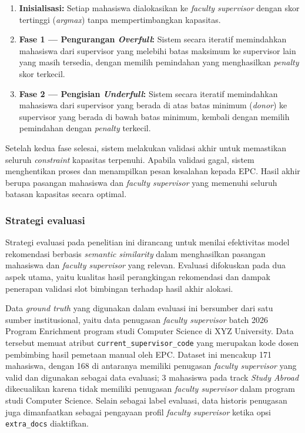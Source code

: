 \begin{enumerate}
    \item \textbf{Inisialisasi:} Setiap mahasiswa dialokasikan ke \textit{faculty supervisor} dengan skor tertinggi (\textit{argmax}) tanpa mempertimbangkan kapasitas.
    \item \textbf{Fase 1 — Pengurangan \textit{Overfull}:} Sistem secara iteratif memindahkan mahasiswa dari supervisor yang melebihi batas maksimum ke supervisor lain yang masih tersedia, dengan memilih pemindahan yang menghasilkan \textit{penalty} skor terkecil.
    \item \textbf{Fase 2 — Pengisian \textit{Underfull}:} Sistem secara iteratif memindahkan mahasiswa dari supervisor yang berada di atas batas minimum (\textit{donor}) ke supervisor yang berada di bawah batas minimum, kembali dengan memilih pemindahan dengan \textit{penalty} terkecil.
\end{enumerate}

Setelah kedua fase selesai, sistem melakukan validasi akhir untuk memastikan seluruh \textit{constraint} kapasitas terpenuhi. Apabila validasi gagal, sistem menghentikan proses dan menampilkan pesan kesalahan kepada EPC. Hasil akhir berupa pasangan mahasiswa dan \textit{faculty supervisor} yang memenuhi seluruh batasan kapasitas secara optimal.

\subsubsection{Strategi evaluasi}\label{strategi-evaluasi}

Strategi evaluasi pada penelitian ini dirancang untuk menilai efektivitas model rekomendasi berbasis \textit{semantic similarity} dalam menghasilkan pasangan mahasiswa dan \textit{faculty supervisor} yang relevan. Evaluasi difokuskan pada dua aspek utama, yaitu kualitas hasil perangkingan rekomendasi dan dampak penerapan validasi slot bimbingan terhadap hasil akhir alokasi.

Data \textit{ground truth} yang digunakan dalam evaluasi ini bersumber dari satu sumber institusional, yaitu data penugasan \textit{faculty supervisor} batch 2026 Program Enrichment program studi Computer Science di XYZ University. Data tersebut memuat atribut \texttt{current\_supervisor\_code} yang merupakan kode dosen pembimbing hasil pemetaan manual oleh EPC. Dataset ini mencakup 171 mahasiswa, dengan 168 di antaranya memiliki penugasan \textit{faculty supervisor} yang valid dan digunakan sebagai data evaluasi; 3 mahasiswa pada track \textit{Study Abroad} dikecualikan karena tidak memiliki penugasan \textit{faculty supervisor} dalam program studi Computer Science. Selain sebagai label evaluasi, data historis penugasan juga dimanfaatkan sebagai pengayaan profil \textit{faculty supervisor} ketika opsi \texttt{extra\_docs} diaktifkan.


